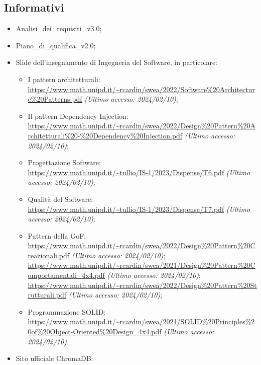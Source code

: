 \subsection{Informativi}
\begin{itemize}
    \item Analisi\_dei\_requisiti\_v3.0;
    \item Piano\_di\_qualifica\_v2.0;
    \item Slide dell’insegnamento di Ingegneria del Software, in particolare:
        \begin{itemize}
            \item I pattern architetturali: \\ \url{https://www.math.unipd.it/~rcardin/swea/2022/Software%20Architecture%20Patterns.pdf} \textit{(Ultimo accesso: 2024/02/10)};
            \item Il pattern Dependency Injection:\\ \url{https://www.math.unipd.it/~rcardin/swea/2022/Design%20Pattern%20Architetturali%20-%20Dependency%20Injection.pdf} \textit{(Ultimo accesso: 2024/02/10)};
            \item Progettazione Software:\\ \url{https://www.math.unipd.it/~tullio/IS-1/2023/Dispense/T6.pdf} \textit{(Ultimo accesso: 2024/02/10)};
            \item Qualità del Software:\\ \url{https://www.math.unipd.it/~tullio/IS-1/2023/Dispense/T7.pdf} \textit{(Ultimo accesso: 2024/02/10)};
            \item Pattern della GoF:\\ \url{https://www.math.unipd.it/~rcardin/swea/2022/Design%20Pattern%20Creazionali.pdf} \textit{(Ultimo accesso: 2024/02/10)};\\
            \url{https://www.math.unipd.it/~rcardin/swea/2021/Design%20Pattern%20Comportamentali_4x4.pdf} \textit{(Ultimo accesso: 2024/02/10)};\\
            \url{https://www.math.unipd.it/~rcardin/swea/2022/Design%20Pattern%20Strutturali.pdf} \textit{(Ultimo accesso: 2024/02/10)};
            \item Programmazione SOLID:\\ \url{https://www.math.unipd.it/~rcardin/swea/2021/SOLID%20Principles%20of%20Object-Oriented%20Design_4x4.pdf} \textit{(Ultimo accesso: 2024/02/10)}.
        \end{itemize}
    \item Sito ufficiale ChromaDB: \\

\end{itemize}

